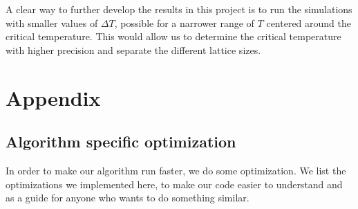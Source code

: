\documentclass[reprint, english,notitlepage,nofootinbib]{revtex4-1}  %
\begin{document}
A clear way to further develop the results in this project is to run the simulations with smaller values of $\Delta T$, possible for a narrower range of $T$ centered around the critical temperature. This would allow us to determine the critical temperature with higher precision and separate the different lattice sizes.



\section{Appendix}
\subsection{Algorithm specific optimization}

In order to make our algorithm run faster, we do some optimization. We list the optimizations we implemented here, to make our code easier to understand and as a guide for anyone who wants to do something similar.
\end{document}
